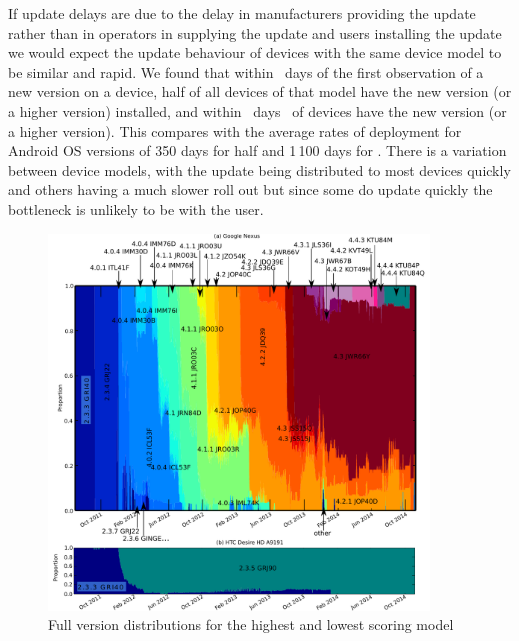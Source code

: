If update delays are due to the delay in manufacturers providing the update rather than in operators in supplying the update and users installing the update we would expect the update behaviour of devices with the same device model to be similar and rapid.
We found that within \daModelHalfDeployment\ days of the first observation of a new version on a device, half of all devices of that model have the new version (or a higher version) installed, and within \daModelFullDeployment\ days \daFullDeployedAt\ of devices have the new version (or a higher version).
This compares with the average rates of deployment for Android OS versions of 350 days for half and 1\,100 days for \daFullDeployedAt.
There is a variation between device models, with the update being distributed to most devices quickly and others having a much slower roll out but since some do update quickly the bottleneck is unlikely to be with the user.

\begin{figure}
 \centering
 \includegraphics[width=0.9\textwidth]{figures/full_version_comp.pdf}
 \caption{Full version distributions for the highest and lowest scoring model}
 \label{fig:full_version_comp}
\end{figure}

